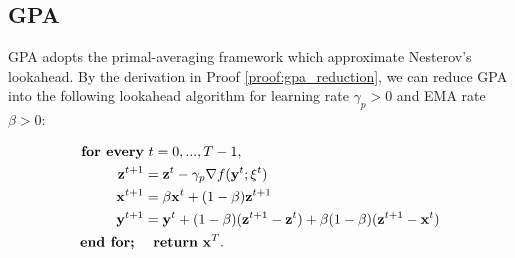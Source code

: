 \documentclass{article}
\theoremstyle{plain}
\theoremstyle{definition}
\theoremstyle{remark}
\def\bx{\mathbf{x}}
\begin{document}
\subsection{GPA} \label{sec:compare_gpa}
GPA \citep{defazio2025smoothing} adopts the primal-averaging framework which approximate Nesterov's lookahead. By the derivation in Proof \ref{proof:gpa_reduction}, we can reduce GPA into the following lookahead algorithm for learning rate $\gamma_p > 0$ and EMA rate $\beta > 0$: 

\begin{equation}  \label{eq:gpa_final}
    \begin{aligned}
    \textbf{for every}&~ t=0, ..., T-1,\\
        {\bf z}^{t+1} &= {\bf z}^t - \gamma_p \nabla f({\bf y}^t; \xi^t) \\
        {\bf x}^{t+1} &= \beta {\bf x}^t + ( 1 - \beta) {\bf z}^{t+1} \\
        {\bf y}^{t+1} &= {\bf y}^{t} + (1- \beta)({\bf z}^{t+1} - {\bf z}^t) + \beta(1-\beta)({\bf z}^{t+1} - {\bf x}^t)\\
    \textbf{end for;}~~&~~\textbf{return}~\bx^T.
    \end{aligned}
\end{equation}
\end{document}
